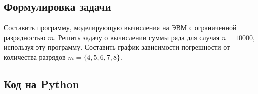 \documentclass[a4paper,12pt]{article}
\newenvironment{longlisting}{\captionsetup{type=listing}}{}
\begin{document}
\subsection{Формулировка задачи}
Составить программу, моделирующую вычисления на ЭВМ с ограниченной разрядностью $m$.
Решить задачу о вычислении суммы ряда для случая $n=10000$, используя эту программу. Составить график зависимости погрешности от количества разрядов $m = \{4, 5, 6, 7, 8\}$.

\subsection{Код на Python}

\begin{longlisting}
\inputminted{python}{series_fixed_precision.py}
\end{longlisting}
\end{document}
